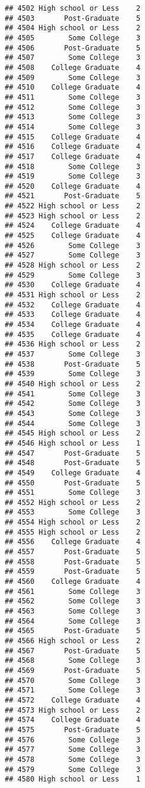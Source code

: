 \documentclass[
]{article}
\begin{document}
\begin{verbatim}
## 4502 High school or Less    2
## 4503       Post-Graduate    5
## 4504 High school or Less    2
## 4505        Some College    3
## 4506       Post-Graduate    5
## 4507        Some College    3
## 4508    College Graduate    4
## 4509        Some College    3
## 4510    College Graduate    4
## 4511        Some College    3
## 4512        Some College    3
## 4513        Some College    3
## 4514        Some College    3
## 4515    College Graduate    4
## 4516    College Graduate    4
## 4517    College Graduate    4
## 4518        Some College    3
## 4519        Some College    3
## 4520    College Graduate    4
## 4521       Post-Graduate    5
## 4522 High school or Less    2
## 4523 High school or Less    2
## 4524    College Graduate    4
## 4525    College Graduate    4
## 4526        Some College    3
## 4527        Some College    3
## 4528 High school or Less    2
## 4529        Some College    3
## 4530    College Graduate    4
## 4531 High school or Less    2
## 4532    College Graduate    4
## 4533    College Graduate    4
## 4534    College Graduate    4
## 4535    College Graduate    4
## 4536 High school or Less    2
## 4537        Some College    3
## 4538       Post-Graduate    5
## 4539        Some College    3
## 4540 High school or Less    2
## 4541        Some College    3
## 4542        Some College    3
## 4543        Some College    3
## 4544        Some College    3
## 4545 High school or Less    2
## 4546 High school or Less    1
## 4547       Post-Graduate    5
## 4548       Post-Graduate    5
## 4549    College Graduate    4
## 4550       Post-Graduate    5
## 4551        Some College    3
## 4552 High school or Less    2
## 4553        Some College    3
## 4554 High school or Less    2
## 4555 High school or Less    2
## 4556    College Graduate    4
## 4557       Post-Graduate    5
## 4558       Post-Graduate    5
## 4559       Post-Graduate    5
## 4560    College Graduate    4
## 4561        Some College    3
## 4562        Some College    3
## 4563        Some College    3
## 4564        Some College    3
## 4565       Post-Graduate    5
## 4566 High school or Less    2
## 4567       Post-Graduate    5
## 4568        Some College    3
## 4569       Post-Graduate    5
## 4570        Some College    3
## 4571        Some College    3
## 4572    College Graduate    4
## 4573 High school or Less    2
## 4574    College Graduate    4
## 4575       Post-Graduate    5
## 4576        Some College    3
## 4577        Some College    3
## 4578        Some College    3
## 4579        Some College    3
## 4580 High school or Less    1

\end{verbatim}
\end{document}
